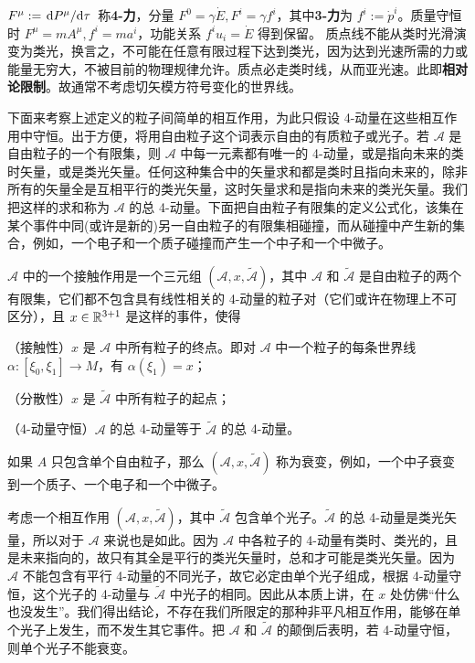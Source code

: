 $F^\mu:=\dv*{P^\mu}{\tau}$ 称\textbf{4-力}，分量 $F^0=\gamma\dot{E},F^i=\gamma f^i$，其中\textbf{3-力}为 $f^i:=\dot{p}^i$。质量守恒时 $F^\mu=m A^\mu,f^i=m a^i$，功能关系 $f^i u_i=\dot{E}$ 得到保留。
质点线不能从类时光滑演变为类光，换言之，不可能在任意有限过程下达到类光，因为达到光速所需的力或能量无穷大，不被目前的物理规律允许。质点必走类时线，从而亚光速。此即\textbf{相对论限制}。故通常不考虑切矢模方符号变化的世界线。

下面来考察上述定义的粒子间简单的相互作用，为此只假设 4-动量在这些相互作用中守恒。出于方便，将用自由粒子这个词表示自由的有质粒子或光子。若 $\mathcal{A}$ 是自由粒子的一个有限集，则 $\mathcal{A}$ 中每一元素都有唯一的 4-动量，或是指向未来的类时矢量，或是类光矢量。任何这种集合中的矢量求和都是类时且指向未来的，除非所有的矢量全是互相平行的类光矢量，这时矢量求和是指向未来的类光矢量。我们把这样的求和称为 $\mathcal{A}$ 的总 4-动量。下面把自由粒子有限集的定义公式化，该集在某个事件中同(或许是新的)另一自由粒子的有限集相碰撞，而从碰撞中产生新的集合，例如，一个电子和一个质子碰撞而产生一个中子和一个中微子。
\begin{definition}[接触作用]
    $\mathcal{A}$ 中的一个接触作用是一个三元组 $(\mathcal{A},x,\widetilde{\mathcal{A}})$，其中 $\mathcal{A}$ 和 $\widetilde{\mathcal{A}}$ 是自由粒子的两个有限集，它们都不包含具有线性相关的 4-动量的粒子对（它们或许在物理上不可区分），且 $x \in\mathbb{R}^{3+1}$ 是这样的事件，使得

（接触性）$x$ 是 $\mathcal{A}$ 中所有粒子的终点。即对 $\mathcal{A}$ 中一个粒子的每条世界线 $\alpha:\left[\xi_{0},\xi_{1}\right] \rightarrow M$，有 $\alpha\left(\xi_{1}\right)=x$；

（分散性）$x$ 是 $\widetilde{\mathcal{A}}$ 中所有粒子的起点；

（4-动量守恒）$\mathcal{A}$ 的总 4-动量等于 $\widetilde{\mathcal{A}}$ 的总 4-动量。

\noindent 如果 $A$ 只包含单个自由粒子，那么 $(\mathcal{A},x,\widetilde{\mathcal{A}})$ 称为衰变，例如，一个中子衰变到一个质子、一个电子和一个中微子。
\end{definition}

考虑一个相互作用 $(\mathcal{A},x,\widetilde{\mathcal{A}})$，其中 $\widetilde{\mathcal{A}}$ 包含单个光子。$\widetilde{\mathcal{A}}$ 的总 4-动量是类光矢量，所以对于 $\mathcal{A}$ 来说也是如此。因为 $\mathcal{A}$ 中各粒子的 4-动量有类时、类光的，且是未来指向的，故只有其全是平行的类光矢量时，总和才可能是类光矢量。因为 $\mathcal{A}$ 不能包含有平行 4-动量的不同光子，故它必定由单个光子组成，根据 4-动量守恒，这个光子的 4-动量与 $\widetilde{\mathcal{A}}$ 中光子的相同。因此从本质上讲，在 $x$ 处仿佛“什么也没发生”。我们得出结论，不存在我们所限定的那种非平凡相互作用，能够在单个光子上发生，而不发生其它事件。把 $\mathcal{A}$ 和 $\widetilde{\mathcal{A}}$ 的颠倒后表明，若 4-动量守恒，则单个光子不能衰变。

